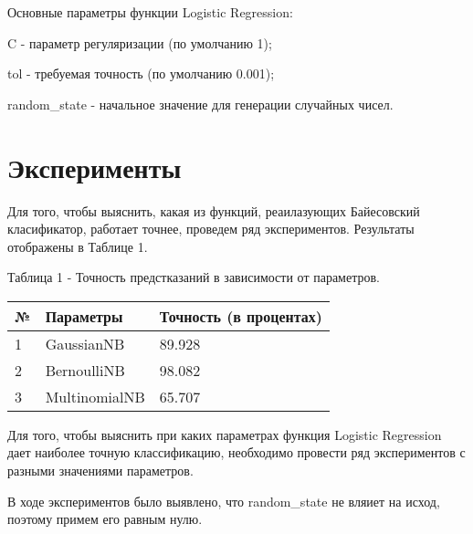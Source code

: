 \documentclass[a4paper,12pt]{article}
\begin{document}
	\vspace{0.5cm}
	Основные параметры функции Logistic Regression:
	
	\vspace{0.5cm}
	C - параметр регуляризации (по умолчанию 1);

	\vspace{0.5cm}
	tol - требуемая точность (по умолчанию 0.001);
	
	\vspace{0.5cm}
	random\_state - начальное значение для генерации случайных чисел.


	
\newpage\section{Эксперименты}
	Для того, чтобы выяснить, какая из функций, реаилазующих Байесовский класификатор, работает точнее, проведем ряд экспериментов. Результаты отображены в Таблице 1.
	
	\vspace{0.5cm}
	Таблица 1 - Точность предстказаний в зависимости от параметров.
\begin{longtable}{|p{1cm}|p{9cm}|p{3cm}|}
\hline 
№ & Параметры & Точность (в процентах) \\ 
\hline 
1 & GaussianNB & 89.928 \\
\hline
2 & BernoulliNB & 98.082 \\
\hline 
3 & MultinomialNB & 65.707 \\
\hline
\end{longtable}	
	
	Для того, чтобы выяснить при каких параметрах функция Logistic Regression дает наиболее точную классификацию, необходимо провести ряд экспериментов с разными значениями параметров. 
	
	В ходе экспериментов было выявлено, что  random\_state не вляиет на исход, поэтому примем его равным нулю.
	
\end{document}
